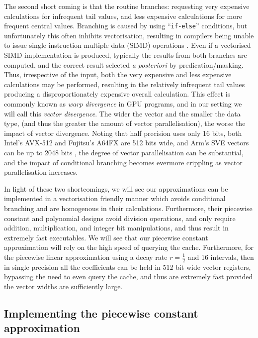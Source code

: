 \documentclass[9pt,a4paper,english]{extarticle}
\begin{document}
The second short coming is that the routine branches: requesting very expensive calculations for infrequent tail values, and less expensive calculations for more frequent central values. Branching is caused by using ``\texttt{if-else}'' conditions, but unfortunately this often inhibits vectorisation, resulting in compilers being unable to issue single instruction multiple data (SIMD) operations \citep{vanderpas2017using}. Even if a vectorised SIMD implementation is produced, typically the results from both branches are computed, and the correct result selected \textit{a posteriori} by predication/masking. Thus, irrespective of the input, both the very expensive and less expensive calculations may be performed, resulting in the relatively infrequent tail values producing a disproportionately expensive overall calculation. This effect is commonly known as \emph{warp divergence} in GPU programs, and in our setting we will call this \emph{vector divergence}. The wider the vector and the smaller the data type, (and thus the greater the amount of vector parallelisation), the worse the impact of vector divergence. Noting that half precision uses only 16 bits, both Intel's AVX-512 and Fujitsu's A64FX are 512 bits wide, and Arm's SVE vectors can be up to 2048 bits \citep{petrogalli2016sneak_peak,stephens2017arm}, the degree of vector parallelisation can be substantial, and the impact of conditional branching becomes evermore crippling as vector parallelisation increases. 

In light of these two shortcomings, we will see our approximations can be implemented in a vectorisation friendly manner which avoids conditional branching and are homogenous in their calculations. Furthermore, their piecewise constant and polynomial designs avoid division operations, and only require addition, multiplication, and integer bit manipulations, and thus result in extremely fast executables. We will see that our piecewise constant approximation will rely on the high speed of querying the cache. Furthermore, for the piecewise linear approximation using a decay rate $ r = \tfrac{1}{2} $ and 16 intervals, then in single precision all the coefficients can be held in 512 bit wide vector registers, bypassing the need to even query the cache, and thus are extremely fast provided the vector widths are sufficiently large. 

\subsection{Implementing the piecewise constant approximation}
\end{document}
